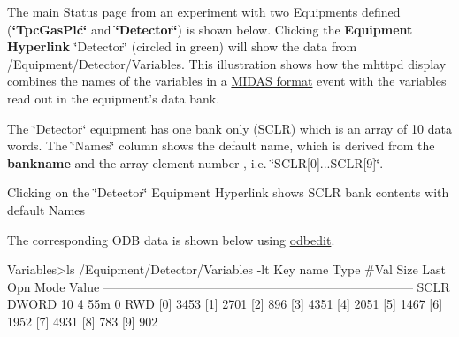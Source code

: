 \label{RC_mhttpd_Equipment_page_RC_mhttpd_Equipment_Hyperlink}
\hypertarget{RC_mhttpd_Equipment_page_RC_mhttpd_Equipment_Hyperlink}{}
 The main Status page from an experiment with two Equipments defined ({\bfseries \char`\"{}TpcGasPlc\char`\"{}} and {\bfseries \char`\"{}Detector\char`\"{}}) is shown below. Clicking the {\bfseries Equipment Hyperlink} \char`\"{}Detector\char`\"{} (circled in green) will show the data from /Equipment/Detector/Variables. This illustration shows how the mhttpd display combines the names of the variables in a \hyperlink{FE_bank_construction_FE_MIDAS_event_construction}{MIDAS format} event with the variables read out in the equipment's data bank. \par
 The \char`\"{}Detector\char`\"{} equipment has one bank only (SCLR) which is an array of 10 data words. The \char`\"{}Names\char`\"{} column shows the default name, which is derived from the {\bfseries bankname} and the array element number , i.e. \char`\"{}SCLR\mbox{[}0\mbox{]}...SCLR\mbox{[}9\mbox{]}\char`\"{}.

\par
\par
\par
 \begin{center}  Clicking on the \char`\"{}Detector\char`\"{} Equipment Hyperlink shows SCLR bank contents with default Names \par
\par
\par
  \end{center}  \par
\par
\par


The corresponding ODB data is shown below using \hyperlink{RC_odbedit_utility}{odbedit}.


\begin{DoxyCode}
Variables>ls /Equipment/Detector/Variables -lt
Key name                        Type    #Val  Size  Last Opn Mode Value
---------------------------------------------------------------------------
SCLR                            DWORD   10    4     55m  0   RWD
                                        [0]             3453
                                        [1]             2701
                                        [2]             896
                                        [3]             4351
                                        [4]             2051
                                        [5]             1467
                                        [6]             1952
                                        [7]             4931
                                        [8]             783
                                        [9]             902
\end{DoxyCode}


